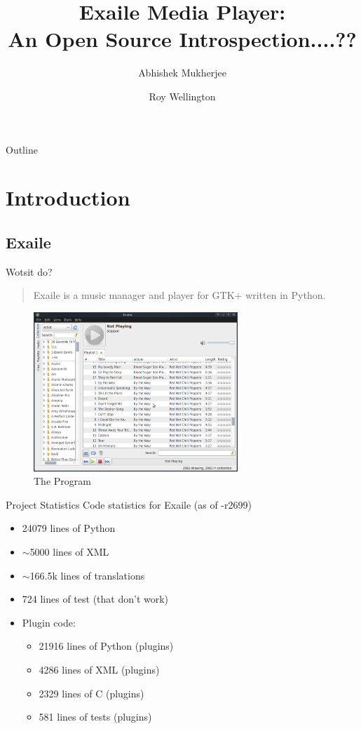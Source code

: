 \documentclass{beamer}
\title
{%
  Exaile Media Player:\\
  An Open Source Introspection....?? %
}
\author
{
  Abhishek Mukherjee \and
  Roy Wellington
}
\begin{document}
\lstset{language=Python}

\begin{frame}
  \titlepage
\end{frame}

\begin{frame}{Outline}
  \tableofcontents
\end{frame}


\section{Introduction}

\subsection{Exaile}

\begin{frame}{Wotsit do?}
  \begin{quote}
    Exaile is a music manager and player for GTK+ written in Python.
  \end{quote}
  \begin{figure}
    \includegraphics[height=60mm]{images/exaile}
    \caption{The Program}
  \end{figure}
\end{frame}

\begin{frame}{Project Statistics}
  Code statistics for Exaile (as of -r2699)
  \begin{itemize}
    \item 24079 lines of Python
    \item $\sim$5000 lines of XML
    \item $\sim$166.5k lines of translations
    \item 724 lines of test (that don't work)
	\item Plugin code:
	\begin{itemize}
      \item 21916 lines of Python (plugins)
      \item 4286 lines of XML (plugins)
      \item 2329 lines of C (plugins)
      \item 581 lines of tests (plugins)
	\end{itemize}
  \end{itemize}
\end{frame}
\end{document}
